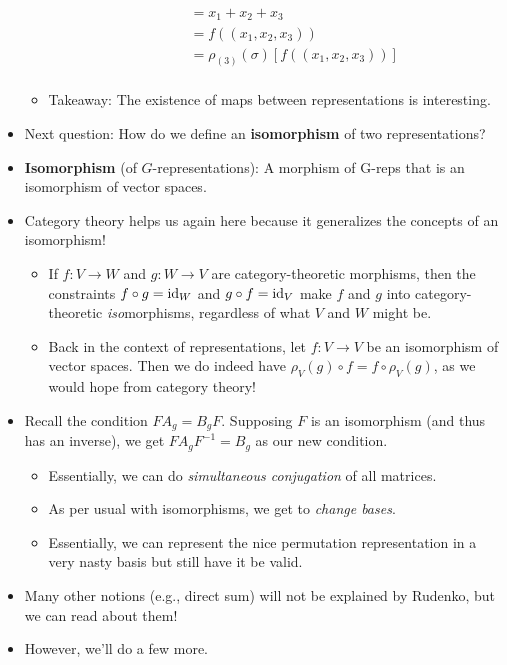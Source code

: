 \documentclass[../notes.tex]{subfiles}
\begin{document}
\begin{itemize}
\begin{itemize}
\begin{itemize}
\begin{align*}
                &= x_1+x_2+x_3\tag*{Commutativity of addition}\\
                &= f((x_1,x_2,x_3))\\
                &= \rho_{(3)}(\sigma)[f((x_1,x_2,x_3))]\\
            \end{align*}
        \end{itemize}
        \item Takeaway: The existence of maps between representations is interesting.
    \end{itemize}
    \item Next question: How do we define an \textbf{isomorphism} of two representations?
    \item \textbf{Isomorphism} (of $G$-representations): A morphism of G-reps that is an isomorphism of vector spaces.
    \item Category theory helps us again here because it generalizes the concepts of an isomorphism!
    \begin{itemize}
        \item If $f:V\to W$ and $g:W\to V$ are category-theoretic morphisms, then the constraints $f\circ g=\operatorname{id}_W$ and $g\circ f=\operatorname{id}_V$ make $f$ and $g$ into category-theoretic \emph{iso}morphisms, regardless of what $V$ and $W$ might be.
        \item Back in the context of representations, let $f:V\to V$ be an isomorphism of vector spaces. Then we do indeed have $\rho_V(g)\circ f=f\circ\rho_V(g)$, as we would hope from category theory!
    \end{itemize}
    \item Recall the condition $FA_g=B_gF$. Supposing $F$ is an isomorphism (and thus has an inverse), we get $FA_gF^{-1}=B_g$ as our new condition.
    \begin{itemize}
        \item Essentially, we can do \emph{simultaneous conjugation} of all matrices.
        \item As per usual with isomorphisms, we get to \emph{change bases}.
        \item Essentially, we can represent the nice permutation representation in a very nasty basis but still have it be valid.
    \end{itemize}
    \item Many other notions (e.g., direct sum) will not be explained by Rudenko, but we can read about them!
    \item However, we'll do a few more.

\end{itemize}
\end{document}
